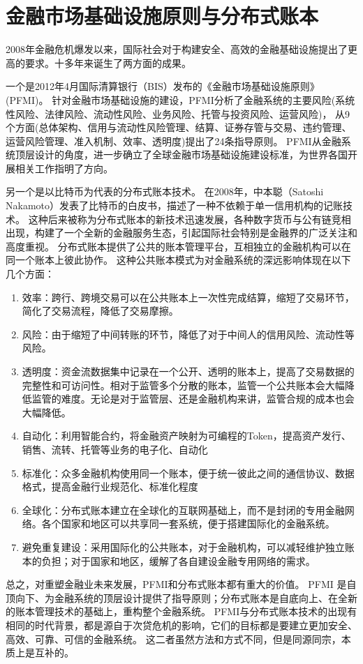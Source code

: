 \section{金融市场基础设施原则与分布式账本}\label{sec:pfmi}

2008年金融危机爆发以来，国际社会对于构建安全、高效的金融基础设施提出了更高的要求。十多年来诞生了两方面的成果。

一个是2012年4月国际清算银行（BIS）发布的《金融市场基础设施原则》(PFMI)\cite{pfmi}。
针对金融市场基础设施的建设，PFMI分析了金融系统的主要风险(系统性风险、法律风险、流动性风险、业务风险、托管与投资风险、运营风险)，
从9个方面(总体架构、信用与流动性风险管理、结算、证券存管与交易、违约管理、运营风险管理、准入机制、效率、透明度)提出了24条指导原则。
PFMI从金融系统顶层设计的角度，进一步确立了全球金融市场基础设施建设标准，为世界各国开展相关工作指明了方向。

另一个是以比特币为代表的分布式账本技术。
在2008年，中本聪（Satoshi Nakamoto）发表了比特币的白皮书，描述了一种不依赖于单一信用机构的记账技术。
这种后来被称为分布式账本的新技术迅速发展，各种数字货币与公有链竞相出现，构建了一个全新的金融服务生态，引起国际社会特别是金融界的广泛关注和高度重视。
分布式账本提供了公共的账本管理平台，互相独立的金融机构可以在同一个账本上彼此协作。
这种公共账本模式为对金融系统的深远影响体现在以下几个方面：

\begin{enumerate}
    \item 效率：跨行、跨境交易可以在公共账本上一次性完成结算，缩短了交易环节，简化了交易流程，降低了交易摩擦。
    \item 风险：由于缩短了中间转账的环节，降低了对于中间人的信用风险、流动性等风险。
    \item 透明度：资金流数据集中记录在一个公开、透明的账本上，提高了交易数据的完整性和可访问性。相对于监管多个分散的账本，监管一个公共账本会大幅降低监管的难度。无论是对于监管层、还是金融机构来讲，监管合规的成本也会大幅降低。
    \item 自动化：利用智能合约，将金融资产映射为可编程的Token，提高资产发行、销售、流转、托管等业务的电子化、自动化
    \item 标准化：众多金融机构使用同一个账本，便于统一彼此之间的通信协议、数据格式，提高金融行业规范化、标准化程度
    \item 全球化：分布式账本建立在全球化的互联网基础上，而不是封闭的专用金融网络。各个国家和地区可以共享同一套系统，便于搭建国际化的金融系统。
    \item 避免重复建设：采用国际化的公共账本，对于金融机构，可以减轻维护独立账本的负担；对于国家和地区，缓解了各自建设金融专用网络的需求。
\end{enumerate}

总之，对重塑金融业未来发展，PFMI和分布式账本都有重大的价值。
PFMI 是自顶向下、为金融系统的顶层设计提供了指导原则；分布式账本是自底向上、在全新的账本管理技术的基础上，重构整个金融系统。
PFMI与分布式账本技术的出现有相同的时代背景，都是源自于次贷危机的影响，它们的目标都是要建立更加安全、高效、可靠、可信的金融系统。
这二者虽然方法和方式不同，但是同源同宗，本质上是互补的。


